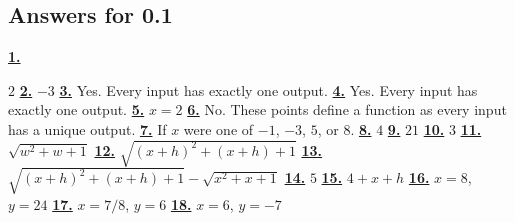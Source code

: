 \subsection *{Answers for 0.1}
\hypertarget {a:0.1.1}{\hyperlink {e:0.1.1}{\bfseries 1.}} \mdseries $2$\qquad 
\hypertarget {a:0.1.2}{\hyperlink {e:0.1.2}{\bfseries 2.}} \mdseries $-3$\qquad 
\hypertarget {a:0.1.3}{\hyperlink {e:0.1.3}{\bfseries 3.}} \mdseries Yes. Every input has exactly one output.\qquad 
\hypertarget {a:0.1.4}{\hyperlink {e:0.1.4}{\bfseries 4.}} \mdseries Yes. Every input has exactly one output.\qquad 
\hypertarget {a:0.1.5}{\hyperlink {e:0.1.5}{\bfseries 5.}} \mdseries $x=2$\qquad 
\hypertarget {a:0.1.6}{\hyperlink {e:0.1.6}{\bfseries 6.}} \mdseries No. These points define a function as every input has a unique output.\qquad 
\hypertarget {a:0.1.7}{\hyperlink {e:0.1.7}{\bfseries 7.}} \mdseries If $x$ were one of $-1$, $-3$, $5$, or $8$.\qquad 
\hypertarget {a:0.1.8}{\hyperlink {e:0.1.8}{\bfseries 8.}} \mdseries $4$\qquad 
\hypertarget {a:0.1.9}{\hyperlink {e:0.1.9}{\bfseries 9.}} \mdseries $21$\qquad 
\hypertarget {a:0.1.10}{\hyperlink {e:0.1.10}{\bfseries 10.}} \mdseries $3$\qquad 
\hypertarget {a:0.1.11}{\hyperlink {e:0.1.11}{\bfseries 11.}} \mdseries $\sqrt {w^2+w+1}$\qquad 
\hypertarget {a:0.1.12}{\hyperlink {e:0.1.12}{\bfseries 12.}} \mdseries $\sqrt {(x+h)^2+(x+h)+1}$\qquad 
\hypertarget {a:0.1.13}{\hyperlink {e:0.1.13}{\bfseries 13.}} \mdseries $\sqrt {(x+h)^2+(x+h)+1} - \sqrt {x^2+x+1}$\qquad 
\hypertarget {a:0.1.14}{\hyperlink {e:0.1.14}{\bfseries 14.}} \mdseries $5$\qquad 
\hypertarget {a:0.1.15}{\hyperlink {e:0.1.15}{\bfseries 15.}} \mdseries $4+x+h$\qquad 
\hypertarget {a:0.1.16}{\hyperlink {e:0.1.16}{\bfseries 16.}} \mdseries $x=8$, $y=24$\qquad 
\hypertarget {a:0.1.17}{\hyperlink {e:0.1.17}{\bfseries 17.}} \mdseries $x=7/8$, $y=6$\qquad 
\hypertarget {a:0.1.18}{\hyperlink {e:0.1.18}{\bfseries 18.}} \mdseries $x=6$, $y=-7$\qquad 
